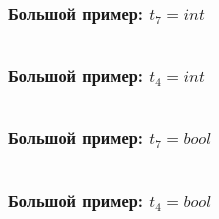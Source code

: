 \documentclass[aspectratio=169]{beamer}
\begin{document}
\begin{frame}[fragile]
  \frametitle{Большой пример: $t_7 = int$}

  \begin{columns}
    \begin{column}{0.3\textwidth}
        
    \end{column}
    \begin{column}{0.7\textwidth}
      \begin{center}
        
      \end{center}
    \end{column}
    \end{columns}
\end{frame}


\begin{frame}[fragile]
  \frametitle{Большой пример: $t_4 = int$}

  \begin{columns}
    \begin{column}{0.3\textwidth}
        
    \end{column}
    \begin{column}{0.7\textwidth}
      \begin{center}
        
      \end{center}
    \end{column}
    \end{columns}
\end{frame}

\begin{frame}[fragile]
  \frametitle{Большой пример: $t_7 = bool$}

  \begin{columns}
    \begin{column}{0.3\textwidth}
        
    \end{column}
    \begin{column}{0.7\textwidth}
      \begin{center}
        
      \end{center}
    \end{column}
    \end{columns}
\end{frame}


\begin{frame}[fragile]
  \frametitle{Большой пример: $t_4 = bool$}

  \begin{columns}
    \begin{column}{0.3\textwidth}
        
    \end{column}
    \begin{column}{0.7\textwidth}
      \begin{center}
        
      \end{center}
    \end{column}
    \end{columns}
\end{frame}
\end{document}
